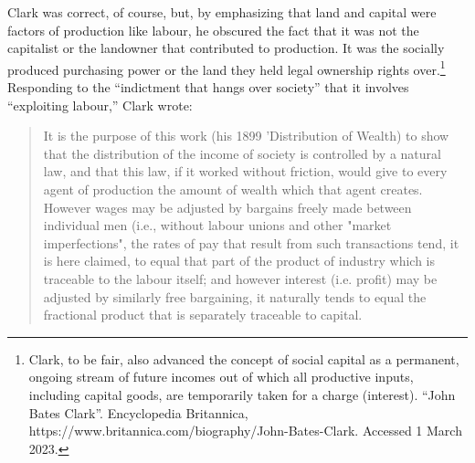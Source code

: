 Clark was correct, of course, but, by emphasizing that land and capital were factors of production like labour, he obscured the fact that it was not the capitalist or the landowner that contributed to production. It was the socially produced purchasing power or the land they held legal ownership rights over.\footnote{Clark, to be fair, also advanced the concept of social capital as a permanent, ongoing stream of future incomes out of which all productive inputs, including capital goods, are temporarily taken for a charge (interest). ``John Bates Clark''. Encyclopedia Britannica, https://www.britannica.com/biography/John-Bates-Clark. Accessed 1 March 2023.}  Responding to the ``indictment that hangs over society'' that it involves ``exploiting labour,'' Clark wrote:
    \begin{quotation}
        It is the purpose of this work (his 1899 'Distribution of Wealth) to show that the distribution of the income of society is controlled by a natural law, and that this law, if it worked without friction, would give to every agent of production the amount of wealth which that agent creates. However wages may be adjusted by bargains freely made between individual men (i.e., without labour unions and other "market imperfections", the rates of pay that result from such transactions tend, it is here claimed, to equal that part of the product of industry which is traceable to the labour itself; and however interest (i.e. profit) may be adjusted by similarly free bargaining, it naturally tends to equal the fractional product that is separately traceable to capital. 
  \end{quotation}
  
